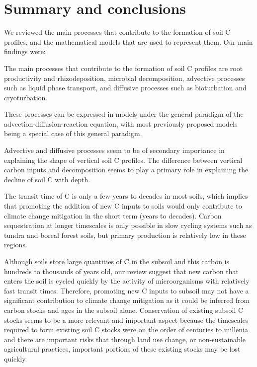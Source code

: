 \documentclass[11pt, oneside, a4paper]{article}   	%
\begin{document}
\section{Summary and conclusions}
We reviewed the main processes that contribute to the formation of soil C profiles, and the mathematical models that are used to represent them. 
Our main findings were: 
\begin{enumerate*}
\item The main processes that contribute to the formation of soil C profiles are root productivity and rhizodeposition, microbial decomposition, advective processes such as liquid phase transport, and diffusive processes such as bioturbation and cryoturbation. 
\item These processes can be expressed in models under the general paradigm of the advection-diffusion-reaction equation, with most previously proposed models being a special case of this general paradigm. 
\item Advective and diffusive processes seem to be of secondary importance in explaining the shape of vertical soil C profiles. The difference between vertical carbon inputs and decomposition seems to play a primary role in explaining the decline of soil C with depth. 
\item The transit time of C is only a few years to decades in most soils, which implies that promoting the addition of new C inputs to soils would only contribute to climate change mitigation in the short term (years to decades). Carbon sequestration at longer timescales is only possible in slow cycling systems such as tundra and boreal forest soils, but primary production is relatively low in these regions.
\end{enumerate*}

Although soils store large quantities of C in the subsoil and this carbon is hundreds to thousands of years old, our review suggest that new carbon that enters the soil is cycled quickly by the activity of microorganisms with relatively fast transit times. Therefore, promoting new C inputs to subsoil may not have a significant contribution to climate change mitigation as it could be inferred from carbon stocks and ages in the subsoil alone. Conservation of existing subsoil C stocks seems to be a more relevant and important aspect because the timescales required to form existing soil C stocks were on the order of centuries to millenia and there are important risks that through land use change, or non-sustainable agricultural practices, important portions of these existing stocks may be lost quickly. 
\end{document}
